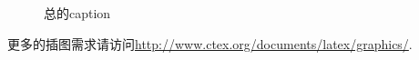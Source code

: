 \begin{figure}[htb]
  \centering
    \caption{总的caption}
  \label{hello5} %
\end{figure} 

更多的插图需求请访问\url{http://www.ctex.org/documents/latex/graphics/}.